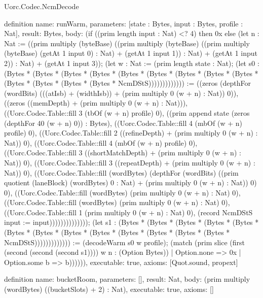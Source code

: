 \begin{lexlean}{Uorc.Codec.NcmDecode}
\begin{semanticmodule}
definition{
  name: runWarm,
  parameters: [state : Bytes, input : Bytes, profile : Nat],
  result: Bytes,
  body: (if ((prim length input : Nat) <? 4) then 0x else (let n : Nat := ((prim multiply (byteBase) ((prim multiply (byteBase) ((prim multiply (byteBase) (getAt 1 input 0) : Nat) + (getAt 1 input 1)) : Nat) + (getAt 1 input 2)) : Nat) + (getAt 1 input 3)); (let w : Nat := (prim length state : Nat); (let s0 : (Bytes * (Bytes * (Bytes * (Bytes * (Bytes * (Bytes * (Bytes * (Bytes * (Bytes * (Bytes * (Bytes * (Bytes * (Bytes * NcmDStS))))))))))))) := ((zeros (depthFor (wordBits) (((atIsb) + (widthIsb)) + (prim multiply 0 (w + n) : Nat)) 0)), ((zeros ((memDepth) + (prim multiply 0 (w + n) : Nat))), ((Uorc.Codec.Table::fill 3 (tbOf (w + n) profile) 0), ((prim append state (zeros (depthFor 40 (w + n) 0)) : Bytes), ((Uorc.Codec.Table::fill 4 (mbOf (w + n) profile) 0), ((Uorc.Codec.Table::fill 2 ((refineDepth) + (prim multiply 0 (w + n) : Nat)) 0), ((Uorc.Codec.Table::fill 4 (mbOf (w + n) profile) 0), ((Uorc.Codec.Table::fill 3 ((shortMatchDepth) + (prim multiply 0 (w + n) : Nat)) 0), ((Uorc.Codec.Table::fill 3 ((repeatDepth) + (prim multiply 0 (w + n) : Nat)) 0), ((Uorc.Codec.Table::fill (wordBytes) (depthFor (wordBits) ((prim quotient (laneBlock) (wordBytes) 0 : Nat) + (prim multiply 0 (w + n) : Nat)) 0) 0), ((Uorc.Codec.Table::fill (wordBytes) (prim multiply 0 (w + n) : Nat) 0), ((Uorc.Codec.Table::fill (wordBytes) (prim multiply 0 (w + n) : Nat) 0), ((Uorc.Codec.Table::fill 1 (prim multiply 0 (w + n) : Nat) 0), (record NcmDStS {input := input})))))))))))))); (let s1 : (Bytes * (Bytes * (Bytes * (Bytes * (Bytes * (Bytes * (Bytes * (Bytes * (Bytes * (Bytes * (Bytes * (Bytes * (Bytes * NcmDStS))))))))))))) := (decodeWarm s0 w profile); (match (prim slice (first (second (second (second s1)))) w n : (Option Bytes))
    | Option.none => 0x
    | Option.some b => b)))))),
  executable: true,
  axioms: [Quot.sound, propext]
}

definition{
  name: bucketRoom,
  parameters: [],
  result: Nat,
  body: (prim multiply (wordBytes) ((bucketSlots) + 2) : Nat),
  executable: true,
  axioms: []
}


\end{semanticmodule}
\end{lexlean}
